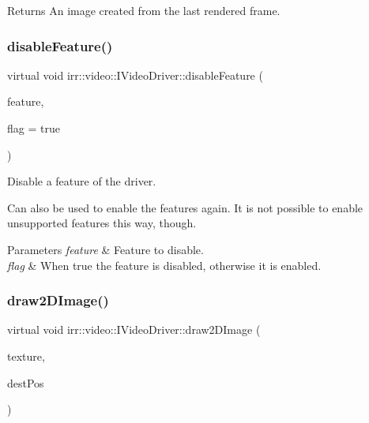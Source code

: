 \begin{DoxyReturn}{Returns}
An image created from the last rendered frame. 
\end{DoxyReturn}
\mbox{\label{classirr_1_1video_1_1IVideoDriver_aea64c03fc205f23ec7575884fb7309c8}} 
\subsubsection{\texorpdfstring{disable\+Feature()}{disableFeature()}}
{\footnotesize\ttfamily virtual void irr\+::video\+::\+I\+Video\+Driver\+::disable\+Feature (\begin{DoxyParamCaption}\item[{\hyperlink{namespaceirr_1_1video_a57b1721e42a79c5dcf8e830e3621e08f}{E\+\_\+\+V\+I\+D\+E\+O\+\_\+\+D\+R\+I\+V\+E\+R\+\_\+\+F\+E\+A\+T\+U\+RE}}]{feature,  }\item[{bool}]{flag = {\ttfamily true} }\end{DoxyParamCaption})\hspace{0.3cm}{\ttfamily [pure virtual]}}



Disable a feature of the driver. 

Can also be used to enable the features again. It is not possible to enable unsupported features this way, though. 
\begin{DoxyParams}{Parameters}
{\em feature} & Feature to disable. \\
\hline
{\em flag} & When true the feature is disabled, otherwise it is enabled. \\
\hline
\end{DoxyParams}
\mbox{\label{classirr_1_1video_1_1IVideoDriver_ac1f12aefefb24414e03876bca942fb02}} 
\subsubsection{\texorpdfstring{draw2\+D\+Image()}{draw2DImage()}\hspace{0.1cm}{\footnotesize\ttfamily [1/3]}}
{\footnotesize\ttfamily virtual void irr\+::video\+::\+I\+Video\+Driver\+::draw2\+D\+Image (\begin{DoxyParamCaption}\item[{const \hyperlink{classirr_1_1video_1_1ITexture}{video\+::\+I\+Texture} $\ast$}]{texture,  }\item[{const core\+::position2d$<$ \hyperlink{namespaceirr_ac66849b7a6ed16e30ebede579f9b47c6}{s32} $>$ \&}]{dest\+Pos }\end{DoxyParamCaption})\hspace{0.3cm}{\ttfamily [pure virtual]}}



